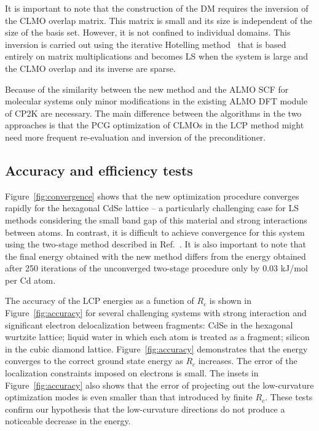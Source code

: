 \documentclass[10pt,amsmath,twocolumn,aps,prl,superscriptaddress,floatfix]{revtex4-1}
\begin{document}
It is important to note that the construction of the DM requires the inversion of the CLMO overlap matrix. 
This matrix is small and its size is independent of the size of the basis set. 
However, it is not confined to individual domains. This inversion is carried out using the iterative Hotelling method~\cite{hotelling1943some} that is based entirely on matrix multiplications and becomes LS when the system is large and the CLMO overlap and its inverse are sparse. 

Because of the similarity between the new method and the ALMO SCF for molecular systems only minor modifications in the existing ALMO DFT module of CP2K are necessary. The main difference between the algorithms in the two approaches is that the PCG optimization of CLMOs in the LCP method might need more frequent re-evaluation and inversion of the preconditioner.


\subsection{Accuracy and efficiency tests}


Figure~\ref{fig:convergence} shows that the new optimization procedure converges rapidly for the hexagonal CdSe lattice -- a particularly challenging case for LS methods considering the small band gap of this material and strong interactions between atoms. 
In contrast, it is difficult to achieve convergence for this system using the two-stage method described in Ref.~\cite{khaliullin2013efficient}. 
It is also important to note that the final energy obtained with the new method differs from the energy obtained after 250 iterations  of the unconverged two-stage procedure only by 0.03 kJ/mol per Cd atom. 


The accuracy of the LCP energies as a function of $R_c$ is shown in Figure~\ref{fig:accuracy} for several challenging systems with strong interaction and significant electron delocalization between fragments: CdSe in the hexagonal wurtzite lattice; liquid water in which each atom is treated as a fragment; silicon in the cubic diamond lattice. 
Figure~\ref{fig:accuracy} demonstrates that the energy converges to the correct ground state energy as $R_c$ increases. The error of the localization constraints imposed on electrons is small. The insets in Figure~\ref{fig:accuracy} also shows that the error of projecting out the low-curvature optimization modes is even smaller than that introduced by finite $R_c$. These tests confirm our hypothesis that the low-curvature directions do not produce a noticeable decrease in the energy.
\end{document}
